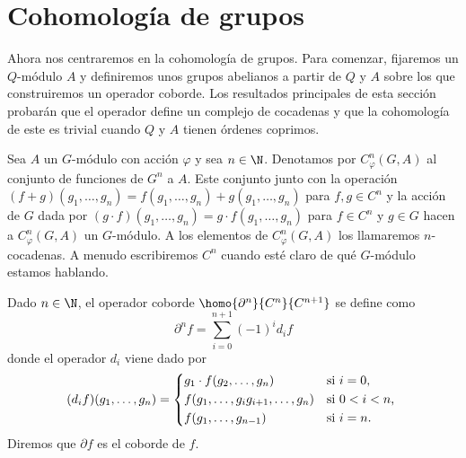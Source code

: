 \section{Cohomología de grupos}

Ahora nos centraremos en la cohomología de grupos. Para comenzar, fijaremos un $Q$-módulo $A$ y definiremos unos grupos abelianos a partir de $Q$ y $A$ sobre los que construiremos un operador coborde. Los resultados principales de esta sección probarán que el operador define un complejo de cocadenas y que la cohomología de este es trivial cuando $Q$ y $A$ tienen órdenes coprimos. 

\begin{definicion}
	Sea $A$ un $G$-módulo con acción $\varphi$ y sea $n\in \N$. Denotamos por $C^n_\varphi(G,A)$ al conjunto de funciones de $G^n$ a $A$. Este conjunto junto con la operación $(f+g)(g_1,\ldots,g_n) = f(g_1,\ldots,g_n) + g(g_1,\ldots,g_n)$ para $f,g\in C^n$ y la acción de $G$ dada por $(g\cdot f)(g_1,\ldots,g_n) = g\cdot f(g_1,\ldots,g_n)$ para $f\in C^n$ y $g\in G$ hacen a $C^n_\varphi(G,A)$ un $G$-módulo. %
	A los elementos de $C^n_\varphi(G,A)$ los llamaremos $n$-cocadenas. A menudo escribiremos $C^n$ cuando esté claro de qué $G$-módulo estamos hablando. %

\end{definicion}


\begin{definicion}
	Dado $n\in \N$, el operador coborde $\homo {\partial^n} {C^n} {C^{n+1}}$ se define como
	\begin{equation*}
		\partial^n f = \sum\limits_{i=0}^{n+1} (-1)^{i} d_i f
	\end{equation*}
	donde el operador $d_i$ viene dado por 
	\[
		(d_if)(g_1,\ldots,g_n) = 
		\begin{cases*} %
			g_1\cdot f(g_2,\ldots,g_n) 				& si $ i=0$, \\
			f(g_1,\ldots,g_ig_{i+1},\ldots,g_n) 	& si $ 0 < i <n$, \\ %
			f(g_1,\ldots,g_{n-1}) 					& si $ i=n$.
		\end{cases*}
	\]
	Diremos que $\partial f$ es el coborde de $f$. %
\end{definicion}

